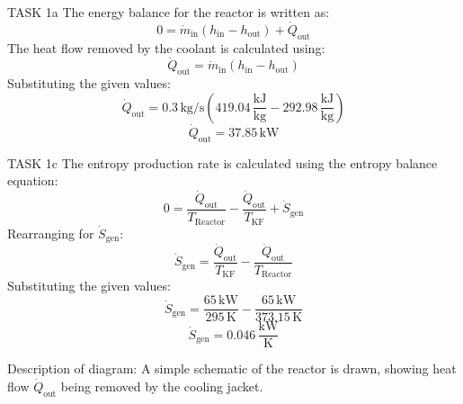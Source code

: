 TASK 1a  
The energy balance for the reactor is written as:  
\[
0 = \dot{m}_{\text{in}} (h_{\text{in}} - h_{\text{out}}) + \dot{Q}_{\text{out}}
\]  
The heat flow removed by the coolant is calculated using:  
\[
\dot{Q}_{\text{out}} = \dot{m}_{\text{in}} (h_{\text{in}} - h_{\text{out}})
\]  
Substituting the given values:  
\[
\dot{Q}_{\text{out}} = 0.3 \, \text{kg/s} \left(419.04 \, \frac{\text{kJ}}{\text{kg}} - 292.98 \, \frac{\text{kJ}}{\text{kg}}\right)
\]  
\[
\dot{Q}_{\text{out}} = 37.85 \, \text{kW}
\]  

TASK 1c  
The entropy production rate is calculated using the entropy balance equation:  
\[
0 = \frac{\dot{Q}_{\text{out}}}{T_{\text{Reactor}}} - \frac{\dot{Q}_{\text{out}}}{T_{\text{KF}}} + \dot{S}_{\text{gen}}
\]  
Rearranging for \( \dot{S}_{\text{gen}} \):  
\[
\dot{S}_{\text{gen}} = \frac{\dot{Q}_{\text{out}}}{T_{\text{KF}}} - \frac{\dot{Q}_{\text{out}}}{T_{\text{Reactor}}}
\]  
Substituting the given values:  
\[
\dot{S}_{\text{gen}} = \frac{65 \, \text{kW}}{295 \, \text{K}} - \frac{65 \, \text{kW}}{373.15 \, \text{K}}
\]  
\[
\dot{S}_{\text{gen}} = 0.046 \, \frac{\text{kW}}{\text{K}}
\]  

Description of diagram:  
A simple schematic of the reactor is drawn, showing heat flow \( \dot{Q}_{\text{out}} \) being removed by the cooling jacket.